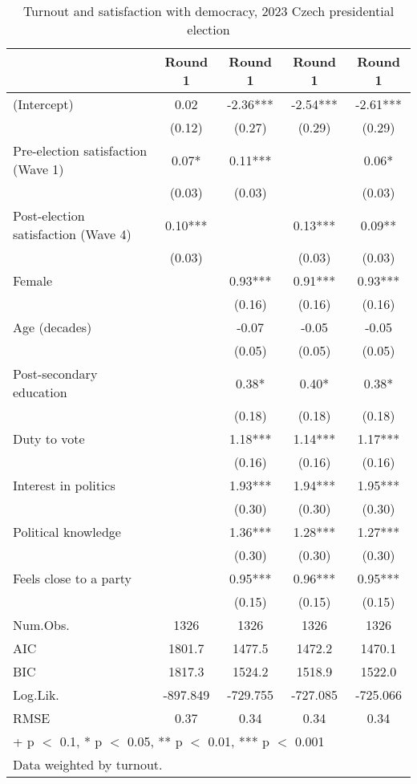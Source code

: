 \begin{table}

\caption{Turnout and satisfaction with democracy, 2023 Czech presidential election}
\centering
\begin{tabular}[t]{lcccc}
\toprule
  & Round 1 & Round 1  & Round 1   & Round 1   \\
\midrule
(Intercept) & 0.02 & -2.36*** & -2.54*** & -2.61***\\
 & (0.12) & (0.27) & (0.29) & (0.29)\\
Pre-election satisfaction (Wave 1) & 0.07* & 0.11*** &  & 0.06*\\
 & (0.03) & (0.03) &  & (0.03)\\
Post-election satisfaction (Wave 4) & 0.10*** &  & 0.13*** & 0.09**\\
 & (0.03) &  & (0.03) & (0.03)\\
Female &  & 0.93*** & 0.91*** & 0.93***\\
 &  & (0.16) & (0.16) & \vphantom{1} (0.16)\\
Age (decades) &  & -0.07 & -0.05 & -0.05\\
 &  & (0.05) & (0.05) & (0.05)\\
Post-secondary education &  & 0.38* & 0.40* & 0.38*\\
 &  & (0.18) & (0.18) & (0.18)\\
Duty to vote &  & 1.18*** & 1.14*** & 1.17***\\
 &  & (0.16) & (0.16) & (0.16)\\
Interest in politics &  & 1.93*** & 1.94*** & 1.95***\\
 &  & (0.30) & (0.30) & \vphantom{1} (0.30)\\
Political knowledge &  & 1.36*** & 1.28*** & 1.27***\\
 &  & (0.30) & (0.30) & (0.30)\\
Feels close to a party &  & 0.95*** & 0.96*** & 0.95***\\
 &  & (0.15) & (0.15) & (0.15)\\
\midrule
Num.Obs. & 1326 & 1326 & 1326 & 1326\\
AIC & 1801.7 & 1477.5 & 1472.2 & 1470.1\\
BIC & 1817.3 & 1524.2 & 1518.9 & 1522.0\\
Log.Lik. & -897.849 & -729.755 & -727.085 & -725.066\\
RMSE & 0.37 & 0.34 & 0.34 & 0.34\\
\bottomrule
\multicolumn{5}{l}{\rule{0pt}{1em}+ p $<$ 0.1, * p $<$ 0.05, ** p $<$ 0.01, *** p $<$ 0.001}\\
\multicolumn{5}{l}{\rule{0pt}{1em}Data weighted by turnout.}\\
\end{tabular}
\end{table}
